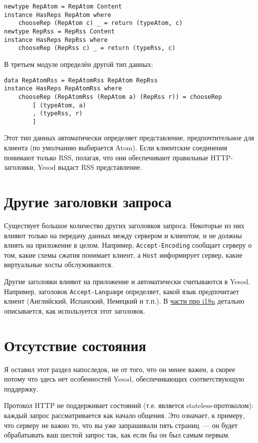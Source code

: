 \begin{lstlisting}
newtype RepAtom = RepAtom Content
instance HasReps RepAtom where
    chooseRep (RepAtom c) _ = return (typeAtom, c)
newtype RepRss = RepRss Content
instance HasReps RepRss where
    chooseRep (RepRss c) _ = return (typeRss, c)
\end{lstlisting}

В третьем модуле определён другой тип данных:

\begin{lstlisting}
data RepAtomRss = RepAtomRss RepAtom RepRss
instance HasReps RepAtomRss where
    chooseRep (RepAtomRss (RepAtom a) (RepRss r)) = chooseRep
        [ (typeAtom, a)
        , (typeRss, r)
        ]
\end{lstlisting}

Этот тип данных автоматически определяет представление, предпочтительное для
клиента (по умолчанию выбирается Atom). Если клиентские соединения понимают
только RSS, полагая, что они обеспечивают правильные HTTP-заголовки, Yesod
выдаст RSS представление.

\section{Другие заголовки запроса}

Существует большое количество других заголовков запроса. Некоторые из них
влияют только на передачу данных между сервером и клиентом, и не должны влиять
на приложение в целом.  Например, \verb*|Accept-Encoding| сообщает серверу о
том, какие схемы сжатия понимает клиент, а \verb*|Host| информирует сервер,
какие виртуальные хосты обслуживаются.

Другие заголовки влияют на приложение и автоматически считываются в Yesod.
Например, заголовок \verb*|Accept-Language| определяет, какой язык предпочитает
клиент (Английский, Испанский, Немецкий и т.п.). В \hyperref[chap:i18n]{части
    про i18n} детально описывается, как используется этот заголовок.

\section{Отсутствие состояния}

Я оставил этот раздел напоследок, не от того, что он менее важен, а скорее
потому что здесь нет особенностей Yesod, обеспечивающих соответствующую
поддержку.

Протокол HTTP не поддерживает состояний (т.е. является stateless-протоколом):
каждый запрос рассматривается как начало общения. Это означает, к примеру, что
серверу не важно то, что вы уже запрашивали пять страниц~--- он будет
обрабатывать ваш шестой запрос так, как если бы он был самым первым.

